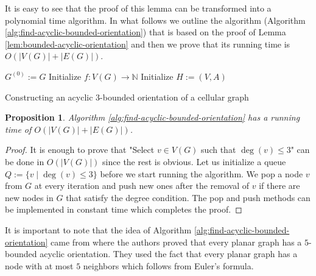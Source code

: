 \documentclass[letterpaper, 10 pt, conference]{ieeeconf}  %
\newtheorem{prop}{Proposition}
\begin{document}
It is easy to see that the proof of this lemma can be transformed into a polynomial time algorithm. In what follows we outline the algorithm (Algorithm \ref{alg:find-acyclic-bounded-orientation}) that is based on the proof of Lemma \ref{lem:bounded-acyclic-orientation} and then we prove that its running time is $O(|V(G)| + |E(G)|)$.
\begin{algorithm}\label{alg:find-acyclic-bounded-orientation}
 $G^{(0)} := G$\;
 Initialize $f \colon V(G) \to \mathbb{N}$\;
 Initialize $H:=(V,A)$\;
 \caption{Constructing an acyclic $3$-bounded orientation of a cellular graph}
\end{algorithm}
\begin{prop} Algorithm \ref{alg:find-acyclic-bounded-orientation} has a running time of $O(|V(G)| + |E(G)|)$.
\end{prop}
\begin{proof}
It is enough to prove that "Select $v \in V(G)$ such that $\deg(v) \leqslant 3$" can be done in $O(|V(G)|)$ since the rest is obvious. Let us initialize a queue $Q := \lbrace v \mid \deg(v) \leqslant  3\rbrace$ before we start running the algorithm. We pop a node $v$ from $G$ at every iteration and push new ones after the removal of $v$ if there are new nodes in $G$ that satisfy the degree condition. The pop and push methods can be implemented in constant time which completes the proof.
\end{proof}
It is important to note that the idea of Algorithm \ref{alg:find-acyclic-bounded-orientation} came from \cite{CHROBAK1991243} where the authors proved that every planar graph has a $5$-bounded acyclic orientation. They used the fact that every planar graph has a node with at most $5$ neighbors which follows from Euler's formula.

\addtolength{\textheight}{-12cm}   %




\end{document}
